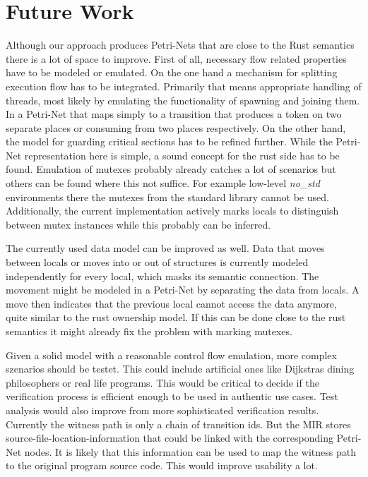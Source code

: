 \chapter{Future Work}
\label{future}
Although our approach produces Petri-Nets that are close to the Rust semantics there is a lot of space to improve.
First of all, necessary flow related properties have to be modeled or emulated.
On the one hand a mechanism for splitting execution flow has to be integrated.
Primarily that means appropriate handling of threads, most likely by emulating the functionality of spawning and joining them.
In a Petri-Net that maps simply to a transition that produces a token on two separate places or consuming from two places respectively.
On the other hand, the model for guarding critical sections has to be refined further.
While the Petri-Net representation here is simple, a sound concept for the rust side has to be found.
Emulation of mutexes probably already catches a lot of scenarios but others can be found where this not suffice.
For example low-level \textit{no\_std} environments there the mutexes from the standard library cannot be used.
Additionally, the current implementation actively marks locals to distinguish between mutex instances while this probably can be inferred.

The currently used data model can be improved as well.
Data that moves between locals or moves into or out of structures is currently modeled independently for every local, which masks its semantic connection.
The movement might be modeled in a Petri-Net by separating the data from locals.
A move then indicates that the previous local cannot access the data anymore, quite similar to the rust ownership model.
If this can be done close to the rust semantics it might already fix the problem with marking mutexes.

Given a solid model with a reasonable control flow emulation, more complex szenarios should be testet.
This could include artificial ones like Dijkstras dining philosophers \cite{dijkstra1971hierarchical} or real life programs.
This would be critical to decide if the verification process is efficient enough to be used in authentic use cases.
Test analysis would also improve from more sophisticated verification results.
Currently the witness path is only a chain of transition ids.
But the MIR stores source-file-location-information that could be linked with the corresponding Petri-Net nodes.
It is likely that this information can be used to map the witness path to the original program source code.
This would improve usability a lot.

